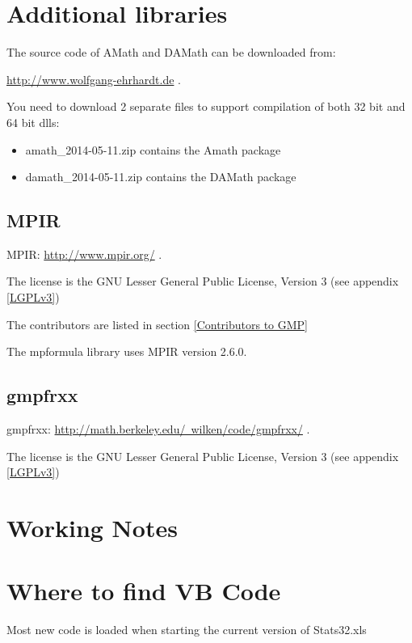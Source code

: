\newpage
\section{Additional libraries}


\vpara
The source code of AMath and DAMath can be downloaded from:

\vpara
\href{http://www.wolfgang-ehrhardt.de}{http://www.wolfgang-ehrhardt.de} . 

You need to download 2 separate files to support compilation of both 32 bit and 64 bit dlls:

\begin{itemize}
	\item amath\_2014-05-11.zip contains the Amath package
	\item damath\_2014-05-11.zip contains the DAMath package
\end{itemize}




\subsection{MPIR}
MPIR: \href{http://www.mpir.org/}{http://www.mpir.org/} . 

The license is the GNU Lesser General Public License, Version 3 (see appendix \ref{LGPLv3})

The contributors are listed in section \ref{Contributors to GMP}

The mpformula library uses MPIR version 2.6.0.



\subsection{gmpfrxx}
gmpfrxx: \href{http://math.berkeley.edu/~wilken/code/gmpfrxx/}{http://math.berkeley.edu/~wilken/code/gmpfrxx/} .

The license is the GNU Lesser General Public License, Version 3 (see appendix \ref{LGPLv3})

%

\section{Working Notes}

\section{Where to find VB Code}
Most new code is loaded when starting the current version of Stats32.xls

